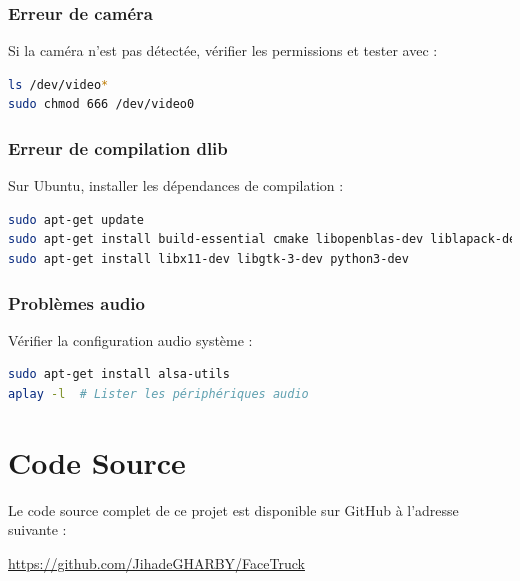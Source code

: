 \documentclass[12pt,a4paper]{article}
\begin{document}
\subsubsection{Erreur de caméra}

Si la caméra n'est pas détectée, vérifier les permissions et tester avec :

\begin{lstlisting}[language=bash]
ls /dev/video*
sudo chmod 666 /dev/video0
\end{lstlisting}

\subsubsection{Erreur de compilation dlib}

Sur Ubuntu, installer les dépendances de compilation :

\begin{lstlisting}[language=bash]
sudo apt-get update
sudo apt-get install build-essential cmake libopenblas-dev liblapack-dev
sudo apt-get install libx11-dev libgtk-3-dev python3-dev
\end{lstlisting}

\subsubsection{Problèmes audio}

Vérifier la configuration audio système :

\begin{lstlisting}[language=bash]
sudo apt-get install alsa-utils
aplay -l  # Lister les périphériques audio
\end{lstlisting}

\renewcommand{\thesection}{\arabic{section}}
\setcounter{section}{8}
\section{Code Source}
Le code source complet de ce projet est disponible sur GitHub à l'adresse suivante :
\begin{center}
\url{https://github.com/JihadeGHARBY/FaceTruck}
\end{center}
\end{document}
